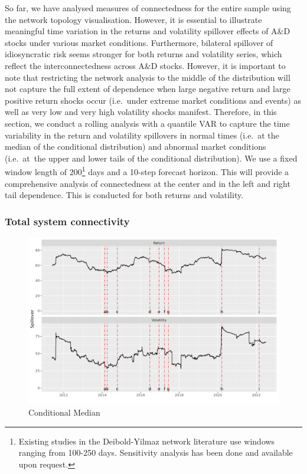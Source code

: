 \documentclass[
  letterpaper,
  DIV=11,
  numbers=noendperiod]{scrartcl}
\begin{document}
So far, we have analysed measures of connectedness for the entire sample
using the network topology visualisation. However, it is essential to
illustrate meaningful time variation in the returns and volatility
spillover effects of A\&D stocks under various market conditions.
Furthermore, bilateral spillover of idiosyncratic risk seems stronger
for both returns and volatility series, which reflect the
interconnectedness across A\&D stocks. However, it is important to note
that restricting the network analysis to the middle of the distribution
will not capture the full extent of dependence when large negative
return and large positive return shocks occur (i.e.~under extreme market
conditions and events) as well as very low and very high volatility
shocks manifest. Therefore, in this section, we conduct a rolling
analysis with a quantile VAR to capture the time variability in the
return and volatility spillovers in normal times (i.e.~at the median of
the conditional distribution) and abnormal market conditions
(i.e.~at~the upper and lower tails of the conditional distribution). We
use a fixed window length of 200\footnote{Existing studies in the
  Deibold-Yilmaz network literature use windows ranging from 100-250
  days. Sensitivity analysis has been done and available upon request.}
days and a 10-step forecast horizon. This will provide a comprehensive
analysis of connectedness at the center and in the left and right tail
dependence. This is conducted for both returns and volatility.

\hypertarget{total-system-connectivity}{%
\subsubsection{Total system
connectivity}\label{total-system-connectivity}}

\begin{figure}[H]

{\centering \includegraphics{plots/fig-TCI50.png}

}

\caption{\label{fig-TCI50}Conditional Median}

\end{figure}
\end{document}
